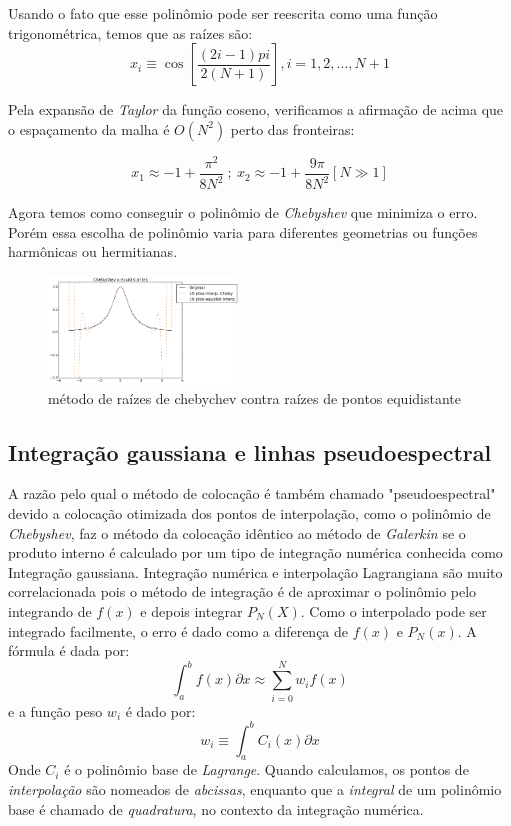  Usando o fato que esse polinômio pode ser reescrita como uma função trigonométrica, temos que as raízes são:
 \begin{equation}
  x_i  \equiv \cos \left [ \frac{(2i - 1)pi}{2(N+1)}  \right ] , i = 1,2,..., N+1
 \end{equation}
 
 Pela expansão de \emph{Taylor} da função coseno, verificamos a afirmação de acima que o espaçamento da malha é $O(N^2)$ perto das fronteiras:
 
 \begin{equation}
  x_1 \approx -1 + \frac{\pi^2}{8N^2}\ ;\ x_2 \approx -1 + \frac{9\pi}{8N^2} [N\gg 1]
 \end{equation}
 
 Agora temos como conseguir o polinômio de \emph{Chebyshev} que minimiza o erro. Porém essa escolha de polinômio varia para diferentes geometrias ou funções harmônicas ou hermitianas.
 \begin{figure}[b]
 \includegraphics[width=0.45\textwidth, center]{figuras/chebychev_equidist.png}
 \caption{método de raízes de chebychev contra raízes de pontos equidistante}
 \end{figure}
\pagebreak
\subsection{Integração gaussiana e linhas pseudoespectral}
 A razão pelo qual o método de colocação é também chamado "pseudoespectral" devido a colocação otimizada dos pontos de interpolação, como o polinômio de \emph{Chebyshev}, faz o método da colocação idêntico ao método de \emph{Galerkin} se o produto interno é calculado por um tipo de integração numérica conhecida como Integração gaussiana.
 Integração numérica e interpolação Lagrangiana são muito correlacionada pois o método de integração é de aproximar o polinômio pelo integrando de $f(x)$ e depois integrar $P_N(X)$. Como o interpolado pode ser integrado facilmente, o erro é dado como a diferença de $f(x)$ e $P_N(x)$.  A fórmula é dada por:
 \begin{equation}
  \int_a^b f(x) \partial x \approx \sum_{i = 0}^N w_i f(x)
 \end{equation}
 e a função peso $w_i$ é dado por:
 \begin{equation}
  w_i \equiv \int_{a}^{b} C_i(x) \partial x
 \end{equation}
 Onde $C_i$ é o polinômio base de \emph{Lagrange}.
 Quando calculamos, os pontos de \emph{interpolação} são nomeados de \emph{abcissas}, enquanto que a \emph{integral} de um polinômio base é chamado de \emph{quadratura}, no contexto da integração numérica.
 
